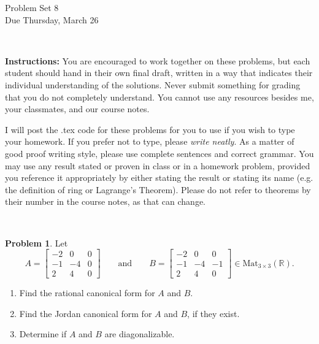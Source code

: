 \documentclass[11pt]{article}
\title{}
\date{\vspace{-0.5in}}
\newcommand{\R}{\mathbb{R}}
\theoremstyle{definition}
\newtheorem{problem}{Problem}
\begin{document}
\thispagestyle{fancy}
\pagestyle{fancy}

\vspace{3em}

\begin{center}
	{\LARGE Problem Set 8 \\}
	Due Thursday, March 26
\end{center}

\

\noindent
{\bf Instructions:}
You are encouraged to work together on these problems, but each student should hand in their own final draft, written in a way that indicates their individual understanding of the solutions. Never submit something for grading that you do not completely understand. You cannot use any resources besides me, your classmates, and our course notes.


I will post the .tex code for these problems for you to use if you wish to type your homework. If you prefer not to type, please  {\em write neatly}. As a matter of good proof writing style, please use complete sentences and correct grammar. You may use any result stated or proven in class or in a homework problem, provided you reference it appropriately by either stating the result or stating its name (e.g. the definition of ring or Lagrange's Theorem). Please do not refer to theorems by their number in the course notes, as that can change.


\

\begin{problem} Let 
\[ A = \begin{bmatrix} -2 & 0 & 0 \\  -1 & -4 & 0 \\ 2 & 4 & 0 \end{bmatrix}  \qquad \text{and} \qquad B = \begin{bmatrix} -2 & 0 & 0 \\  -1 & -4 & -1 \\ 2 & 4 & 0 \end{bmatrix} \in \mathrm{Mat}_{3 \times 3}(\R).\]
\begin{enumerate}
\item[(a)] Find the rational canonical form for $A$ and $B$.
\item[(b)] Find the Jordan canonical form for $A$ and $B$, if they exist.
\item[(c)] Determine if $A$ and $B$ are diagonalizable.
\end{enumerate}
\end{problem}
\end{document}
